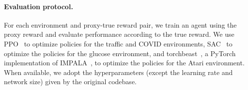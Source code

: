 \paragraph{Evaluation protocol.} For each environment and proxy-true reward pair, we train an agent using the proxy reward and evaluate performance according to the true reward. We use PPO~\citep{schulman2017ppo} to optimize policies for the traffic and COVID environments, SAC~\citep{haarnoja2018sac} to optimize the policies for the glucose environment, and  torchbeast~\citep{torchbeast2019}, a PyTorch implementation of IMPALA~\citep{espeholt2018impala}, to optimize the policies for the Atari environment. When available, we adopt the hyperparameters (except the learning rate and network size) given by the original codebase.


